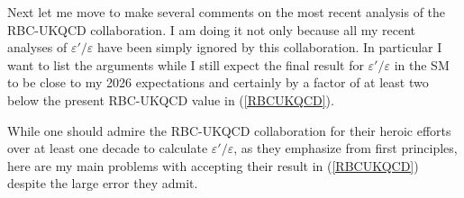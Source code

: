 \documentclass[12pt,a4paper]{article}
\def\epe{\varepsilon'/\varepsilon}
\begin{document}
Next let me move to make several comments on the most recent analysis
of the RBC-UKQCD collaboration. I am doing it not only because
all my recent analyses of $\epe$ \cite{Buras:2018ozh,Aebischer:2019mtr,Buras:2019vik,Aebischer:2020jto,Buras:2020pjp} have been simply ignored
by this collaboration.
In particular I want to 
list the  arguments while I still expect the final result for $\epe$ in the SM to be close
to my 2026 expectations and certainly by a factor of at least two below the
present RBC-UKQCD value in (\ref{RBCUKQCD}).


  
While one should admire the RBC-UKQCD collaboration for their heroic efforts
over at least one decade to calculate
  $\epe$, as they emphasize from first principles, here are my main problems with accepting their result in (\ref{RBCUKQCD}) despite the   large error they admit.
\end{document}
